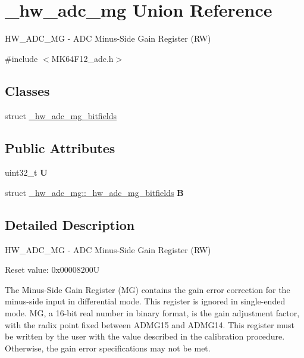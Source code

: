 \hypertarget{union__hw__adc__mg}{}\section{\+\_\+hw\+\_\+adc\+\_\+mg Union Reference}
\label{union__hw__adc__mg}


H\+W\+\_\+\+A\+D\+C\+\_\+\+MG -\/ A\+DC Minus-\/\+Side Gain Register (RW)  




{\ttfamily \#include $<$M\+K64\+F12\+\_\+adc.\+h$>$}

\subsection*{Classes}
\begin{DoxyCompactItemize}
\item 
struct \hyperlink{struct__hw__adc__mg_1_1__hw__adc__mg__bitfields}{\+\_\+hw\+\_\+adc\+\_\+mg\+\_\+bitfields}
\end{DoxyCompactItemize}
\subsection*{Public Attributes}
\begin{DoxyCompactItemize}
\item 
uint32\+\_\+t {\bfseries U}\hypertarget{union__hw__adc__mg_a3324f400e082803d775548c11d36fec3}{}\label{union__hw__adc__mg_a3324f400e082803d775548c11d36fec3}

\item 
struct \hyperlink{struct__hw__adc__mg_1_1__hw__adc__mg__bitfields}{\+\_\+hw\+\_\+adc\+\_\+mg\+::\+\_\+hw\+\_\+adc\+\_\+mg\+\_\+bitfields} {\bfseries B}\hypertarget{union__hw__adc__mg_af128d9572d6094311d721c380b766a35}{}\label{union__hw__adc__mg_af128d9572d6094311d721c380b766a35}

\end{DoxyCompactItemize}


\subsection{Detailed Description}
H\+W\+\_\+\+A\+D\+C\+\_\+\+MG -\/ A\+DC Minus-\/\+Side Gain Register (RW) 

Reset value\+: 0x00008200U

The Minus-\/\+Side Gain Register (MG) contains the gain error correction for the minus-\/side input in differential mode. This register is ignored in single-\/ended mode. MG, a 16-\/bit real number in binary format, is the gain adjustment factor, with the radix point fixed between A\+D\+M\+G15 and A\+D\+M\+G14. This register must be written by the user with the value described in the calibration procedure. Otherwise, the gain error specifications may not be met. 


